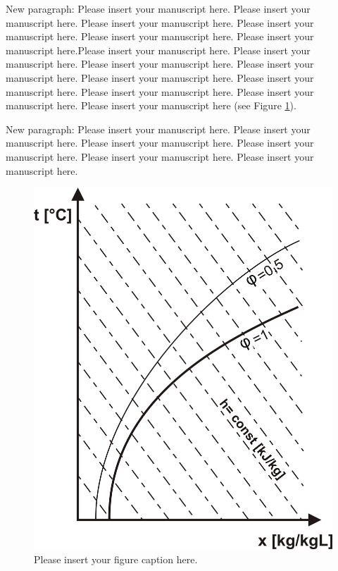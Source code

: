 \documentclass[USenglish,twocolumn]{article}
\begin{document}
New paragraph: Please insert your manuscript here. Please insert your manuscript here. Please insert your manuscript here. Please insert your manuscript here. Please insert your manuscript here. Please insert your manuscript here.Please insert your manuscript here. Please insert your manuscript here. Please insert your manuscript here. Please insert your manuscript here. Please insert your manuscript here. Please insert your manuscript here. Please insert your manuscript here. Please insert your manuscript here. Please insert your manuscript here (see Figure \ref{img:Figure1}).

New paragraph: Please insert your manuscript here. Please insert your manuscript here. Please insert your manuscript here. Please insert your manuscript here. Please insert your manuscript here. Please insert your manuscript here.

\begin{figure}
	\includegraphics[width=\columnwidth]{graphics/figure1}
	\caption{Please insert your figure caption here.}
	\label{img:Figure1}
\end{figure}
\end{document}
